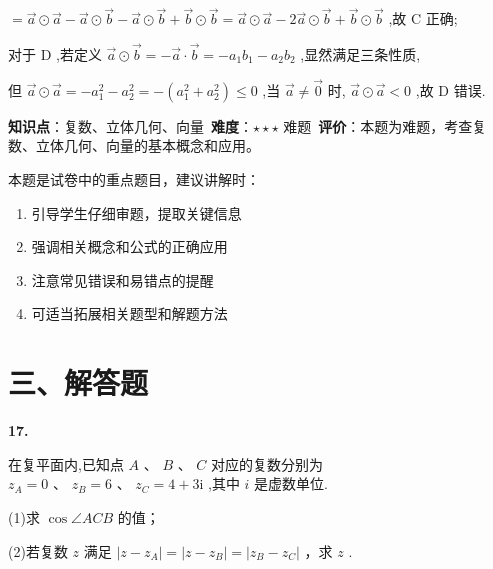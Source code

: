 \documentclass[10pt]{article}
\newenvironment{questionblock}[1]{%
  \needspace{3\baselineskip}%
  \noindent\textbf{#1.}%
}{%
  \par\vspace{1em}%
}
\begin{document}
\(= \overrightarrow{a} \odot  \overrightarrow{a} - \overrightarrow{a} \odot  \overrightarrow{b} - \overrightarrow{a} \odot  \overrightarrow{b} + \overrightarrow{b} \odot  \overrightarrow{b} = \overrightarrow{a} \odot  \overrightarrow{a} - 2\overrightarrow{a} \odot  \overrightarrow{b} + \overrightarrow{b} \odot  \overrightarrow{b}\) ,故 C 正确;

对于 \(\mathrm{D}\) ,若定义 \(\overrightarrow{a} \odot  \overrightarrow{b} =  - \overrightarrow{a} \cdot  \overrightarrow{b} =  - {a}_{1}{b}_{1} - {a}_{2}{b}_{2}\) ,显然满足三条性质,

但 \(\overrightarrow{a} \odot  \overrightarrow{a} =  - {a}_{1}^{2} - {a}_{2}^{2} =  - \left( {{a}_{1}^{2} + {a}_{2}^{2}}\right)  \leq  0\) ,当 \(\overrightarrow{a} \neq  \overrightarrow{0}\) 时, \(\overrightarrow{a} \odot  \overrightarrow{a} < 0\) ,故 D 错误.

\begin{analysisbox}[考点分析]
\textbf{知识点}：复数、立体几何、向量\
\textbf{难度}：$\star\star\star$ 难题\
\textbf{评价}：本题为难题，考查复数、立体几何、向量的基本概念和应用。
\end{analysisbox}

\begin{tipbox}[教学提示]
本题是试卷中的重点题目，建议讲解时：
\begin{enumerate}
\item 引导学生仔细审题，提取关键信息
\item 强调相关概念和公式的正确应用
\item 注意常见错误和易错点的提醒
\item 可适当拓展相关题型和解题方法
\end{enumerate}
\end{tipbox}

\section*{三、解答题}

\begin{questionblock}{17}
在复平面内,已知点 \(A\text{ 、 }B\text{ 、 }C\) 对应的复数分别为 \({z}_{A} = 0\text{ 、 }{z}_{B} = 6\text{ 、 }{z}_{C} = 4 + 3\mathrm{i}\) ,其中 \(i\) 是虚数单位.

(1)求 \(\cos \angle {ACB}\) 的值；

(2)若复数 \(z\) 满足 \(\left| {z - {z}_{A}}\right|  = \left| {z - {z}_{B}}\right|  = \left| {{z}_{B} - {z}_{C}}\right|\) ，求 \(z\) .
\end{questionblock}
\end{document}

